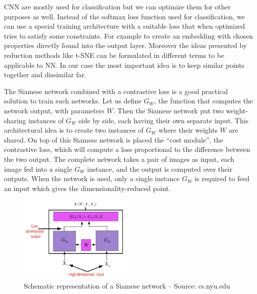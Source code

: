 \documentclass[a4paper,12pt]{report}
\begin{document}
CNN are mostly used for classification but we can optimize them for other purposes as well.
Instead of the softmax loss function used for classification, we can use a special training architecture with a suitable loss that when optimized tries to satisfy some constraints.
For example to create an embedding with chosen properties directly found into the output layer.
Moreover the ideas presented by reduction methods like t-SNE can be formulated in different terms to be applicable to NN.
In our case the most important idea is to keep similar points together and dissimilar far.

The Siamese network combined with a contrastive loss is a good practical solution to train such networks\cite{bromley1993signature}\cite{chopra2005learning}.
Let us define $G_W$, the function that computes the network output, with parameters $W$.
Then the Siamese network put two weight-sharing instances of $G_W$ side by side, each having their own separate input.
This architectural idea is to create two instances of $G_W$ where their weights $W$ are shared.
On top of this Siamese network is placed the ``cost module'', the contrastive loss, which will compute a loss proportional to the difference between the two output.
The complete network takes a pair of images as input, each image fed into a single $G_W$ instance, and the output is computed over their outputs.
When the network is used, only a single instance $G_W$ is required to feed an input which gives the dimensionality-reduced point.

\begin{figure}[h]
    \begin{center}
        \includegraphics[width=0.5\textwidth]{thesis_figures/siamese_network.jpg}
    \end{center}
    \caption{Schematic representation of a Siamese network -- Source: cs.nyu.edu}
    \label{fig:siamese_network}
\end{figure}
\end{document}
